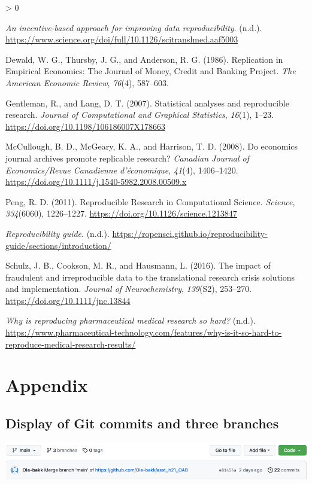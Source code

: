 \documentclass[
  11pt,
]{article}
\newlength{\cslhangindent}
\newenvironment{CSLReferences}[2] %
 {%
  \setlength{\parindent}{0pt}
  \ifodd #1 \everypar{\setlength{\hangindent}{\cslhangindent}}\ignorespaces\fi
  \ifnum #2 > 0
  \setlength{\parskip}{#2\baselineskip}
  \fi
 }%
 {}
\begin{document}
\hypertarget{refs}{}
\begin{CSLReferences}{1}{0}
\leavevmode\hypertarget{ref-Science.org}{}%
\emph{An incentive-based approach for improving data reproducibility}.
(n.d.).
\url{https://www.science.org/doi/full/10.1126/scitranslmed.aaf5003}

\leavevmode\hypertarget{ref-dewald1986}{}%
Dewald, W. G., Thursby, J. G., and Anderson, R. G. (1986). Replication
in {Empirical Economics}: {The Journal} of {Money}, {Credit} and
{Banking Project}. \emph{The American Economic Review}, \emph{76}(4),
587--603.

\leavevmode\hypertarget{ref-gentleman2007}{}%
Gentleman, R., and Lang, D. T. (2007). Statistical analyses and
reproducible research. \emph{Journal of Computational and Graphical
Statistics}, \emph{16}(1), 1--23.
\url{https://doi.org/10.1198/106186007X178663}

\leavevmode\hypertarget{ref-mccullough2008}{}%
McCullough, B. D., McGeary, K. A., and Harrison, T. D. (2008). Do
economics journal archives promote replicable research? \emph{Canadian
Journal of Economics/Revue Canadienne d'économique}, \emph{41}(4),
1406--1420. \url{https://doi.org/10.1111/j.1540-5982.2008.00509.x}

\leavevmode\hypertarget{ref-peng2011}{}%
Peng, R. D. (2011). Reproducible {Research} in {Computational Science}.
\emph{Science}, \emph{334}(6060), 1226--1227.
\url{https://doi.org/10.1126/science.1213847}

\leavevmode\hypertarget{ref-Git-reproducabilty}{}%
\emph{Reproducibility guide}. (n.d.).
\url{https://ropensci.github.io/reproducibility-guide/sections/introduction/}

\leavevmode\hypertarget{ref-schulz2016}{}%
Schulz, J. B., Cookson, M. R., and Hausmann, L. (2016). The impact of
fraudulent and irreproducible data to the translational research crisis
{{}} solutions and implementation. \emph{Journal of Neurochemistry},
\emph{139}(S2), 253--270. \url{https://doi.org/10.1111/jnc.13844}

\leavevmode\hypertarget{ref-Pharm-tech}{}%
\emph{Why is reproducing pharmaceutical medical research so hard?}
(n.d.).
\url{https://www.pharmaceutical-technology.com/features/why-is-it-so-hard-to-reproduce-medical-research-results/}

\end{CSLReferences}

\hypertarget{appendix}{%
\section{Appendix}\label{appendix}}

\hypertarget{display-of-git-commits-and-three-branches}{%
\subsection{Display of Git commits and three
branches}\label{display-of-git-commits-and-three-branches}}

\includegraphics{images/paste-7A7BFE4C.png}
\end{document}
